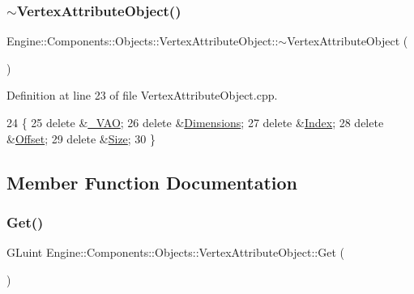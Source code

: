 \subsubsection{\texorpdfstring{$\sim$\+Vertex\+Attribute\+Object()}{~VertexAttributeObject()}}
{\footnotesize\ttfamily Engine\+::\+Components\+::\+Objects\+::\+Vertex\+Attribute\+Object\+::$\sim$\+Vertex\+Attribute\+Object (\begin{DoxyParamCaption}{ }\end{DoxyParamCaption})}



Definition at line 23 of file Vertex\+Attribute\+Object.\+cpp.


\begin{DoxyCode}
24 \{
25     \textcolor{keyword}{delete} &\mbox{\hyperlink{classEngine_1_1Components_1_1Objects_1_1VertexAttributeObject_a66edf6b8734008170901528cb3b07802}{\_VAO}};
26     \textcolor{keyword}{delete} &\mbox{\hyperlink{classEngine_1_1Components_1_1Objects_1_1VertexAttributeObject_aa440859216dad8d94b7a56d4d105fadf}{Dimensions}};
27     \textcolor{keyword}{delete} &\mbox{\hyperlink{classEngine_1_1Components_1_1Objects_1_1VertexAttributeObject_a854d40f88b9c4cd8e57be7a3d3f72e39}{Index}};
28     \textcolor{keyword}{delete} &\mbox{\hyperlink{classEngine_1_1Components_1_1Objects_1_1VertexAttributeObject_a2eadc0a67482dfff8bc65d91e2e974b9}{Offset}};
29     \textcolor{keyword}{delete} &\mbox{\hyperlink{classEngine_1_1Components_1_1Objects_1_1VertexAttributeObject_aadad45ab6562ea5054b5ce9761c1f2d1}{Size}};
30 \}
\end{DoxyCode}


\subsection{Member Function Documentation}
\mbox{\label{classEngine_1_1Components_1_1Objects_1_1VertexAttributeObject_aa67306f65eb1377693630b05bae4fa70}} 
\subsubsection{\texorpdfstring{Get()}{Get()}}
{\footnotesize\ttfamily G\+Luint Engine\+::\+Components\+::\+Objects\+::\+Vertex\+Attribute\+Object\+::\+Get (\begin{DoxyParamCaption}{ }\end{DoxyParamCaption})}



